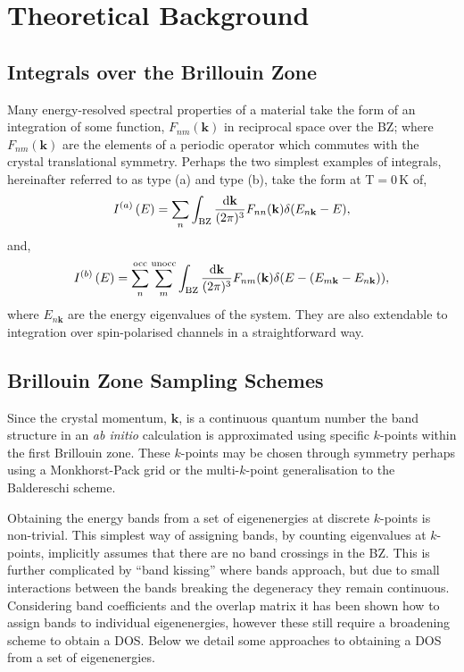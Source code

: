 \documentclass[a4paper,11pt,twoside]{book}
\newcommand{\kbf}{\mathbf{k}}
\renewcommand{\d}{\mathrm{d}}
\begin{document}
\chapter{Theoretical Background} \label{sec:theory}

\section{Integrals over the Brillouin Zone}

Many energy-resolved spectral properties of a material take the form of an integration of some function, $F_{nm}(\kbf)$ in  reciprocal space over the BZ; where $F_{nm}(\kbf)$ are the elements of a periodic operator which commutes with the crystal translational symmetry.
%
Perhaps the two simplest examples of integrals, hereinafter referred to as type (a) and type (b), take the form at T$=0\,$K of,
\begin{equation}
I^{(a)} \left ( E \right) = \sum_n \int_{\rm BZ} \frac {\d\kbf}{(2\pi)^3} F_{nn}(\kbf) \delta (E_{n\kbf}-E),
\end{equation}
and,
\begin{equation}
I^{(b)} \left ( E \right) = \sum^{\rm occ}_n \sum^{\rm unocc}_m
\int_{\rm BZ} \frac {\d\kbf}{(2\pi)^3} F_{nm}(\kbf) \delta ( E - (E_{m\kbf}-E_{n\kbf})),
\label{Eqn:IntB}
\end{equation}
where $E_{n\kbf}$ are the energy eigenvalues of the system. 
%
They are also extendable to integration over spin-polarised channels
in a straightforward way.

\section{Brillouin Zone Sampling Schemes}

Since the crystal momentum, $\kbf$, is a continuous quantum number the band structure in an \emph{ab initio} calculation is approximated using specific $k$-points within the first Brillouin zone.
%
These $k$-points may be chosen through symmetry perhaps using a Monkhorst-Pack grid \cite{monkhorst:PRB:1976} or  the multi-$k$-point generalisation to the Baldereschi scheme\cite{rajagopal:PRL:1994,morris:PRB:2008}.


Obtaining the energy bands from a set of eigenenergies at discrete $k$-points is non-trivial. 
%
This simplest way of assigning bands, by counting eigenvalues at $k$-points, implicitly assumes that there are no band crossings in the BZ.
%
This is further complicated by ``band kissing'' where bands approach, but due to small interactions between the bands breaking the degeneracy they remain continuous\cite{blochl:PRB:1994,pickard:PRB:1999}.
%
Considering band coefficients and the overlap matrix it has been shown how to assign bands to individual eigenenergies\cite{yazyev:PRB:2002,refson:o2b}, however these still require a broadening scheme to obtain a DOS.
%
Below we detail some approaches to obtaining a DOS from a set of eigenenergies.
\end{document}
